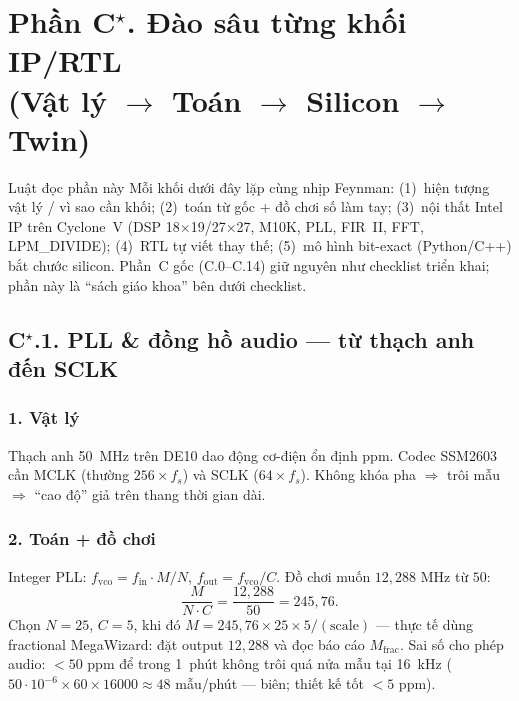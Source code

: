 

\section*{Phần C$^\star$. Đào sâu từng khối IP/RTL\\(Vật lý $\to$ Toán $\to$ Silicon $\to$ Twin)}

\begin{firstprin}{Luật đọc phần này}
Mỗi khối dưới đây lặp cùng nhịp Feynman: (1)~hiện tượng vật lý / vì sao cần khối; (2)~toán từ gốc + đồ chơi số làm tay; (3)~nội thất Intel IP trên Cyclone~V (DSP 18$\times$19/27$\times$27, M10K, PLL, FIR~II, FFT, LPM\_DIVIDE); (4)~RTL tự viết thay thế; (5)~mô hình bit-exact (Python/C++) bắt chước silicon. Phần~C gốc (C.0--C.14) giữ nguyên như checklist triển khai; phần này là ``sách giáo khoa'' bên dưới checklist.
\end{firstprin}

\subsection*{C$^\star$.1. PLL \& đồng hồ audio --- từ thạch anh đến SCLK}

\subsubsection*{1. Vật lý}
Thạch anh 50~MHz trên DE10 dao động cơ-điện ổn định ppm. Codec SSM2603 cần MCLK (thường $256\times f_s$) và SCLK ($64\times f_s$). Không khóa pha $\Rightarrow$ trôi mẫu $\Rightarrow$ ``cao độ'' giả trên thang thời gian dài.

\subsubsection*{2. Toán + đồ chơi}
Integer PLL: $f_{\mathrm{vco}}=f_{\mathrm{in}}\cdot M/N$, $f_{\mathrm{out}}=f_{\mathrm{vco}}/C$.
Đồ chơi muốn $12{,}288\text{ MHz}$ từ $50$:
\[
\frac{M}{N\cdot C}=\frac{12{,}288}{50}=245{,}76.
\]
Chọn $N=25$, $C=5$, khi đó $M=245{,}76\times25\times5/(\text{scale})$ --- thực tế dùng fractional MegaWizard: đặt output $12{,}288$ và đọc báo cáo $M_{\mathrm{frac}}$. Sai số cho phép audio: $<50\text{ ppm}$ để trong 1~phút không trôi quá nửa mẫu tại 16~kHz ($50\cdot10^{-6}\times60\times16000\approx48$ mẫu/phút --- biên; thiết kế tốt $<5\text{ ppm}$).

